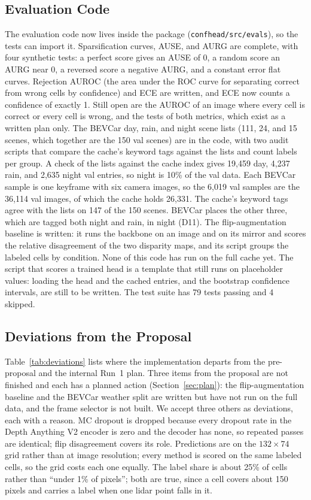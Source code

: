 \subsection{Evaluation Code}

The evaluation code now lives inside the package (\texttt{confhead/src/evals}), so the tests can import it. Sparsification curves, AUSE, and AURG are complete, with four synthetic tests: a perfect score gives an AUSE of 0, a random score an AURG near 0, a reversed score a negative AURG, and a constant error flat curves. Rejection AUROC (the area under the ROC curve for separating correct from wrong cells by confidence) and ECE are written, and ECE now counts a confidence of exactly 1. Still open are the AUROC of an image where every cell is correct or every cell is wrong, and the tests of both metrics, which exist as a written plan only. The BEVCar day, rain, and night scene lists (111, 24, and 15 scenes, which together are the 150 val scenes) are in the code, with two audit scripts that compare the cache's keyword tags against the lists and count labels per group. A check of the lists against the cache index gives 19,459 day, 4,237 rain, and 2,635 night val entries, so night is 10\% of the val data. Each BEVCar sample is one keyframe with six camera images, so the 6,019 val samples are the 36,114 val images, of which the cache holds 26,331. The cache's keyword tags agree with the lists on 147 of the 150 scenes. BEVCar places the other three, which are tagged both night and rain, in night (D11). The flip-augmentation baseline is written: it runs the backbone on an image and on its mirror and scores the relative disagreement of the two disparity maps, and its script groups the labeled cells by condition. None of this code has run on the full cache yet. The script that scores a trained head is a template that still runs on placeholder values: loading the head and the cached entries, and the bootstrap confidence intervals, are still to be written. The test suite has 79 tests passing and 4 skipped.

\subsection{Deviations from the Proposal}

Table~\ref{tab:deviations} lists where the implementation departs from the pre-proposal and the internal Run~1 plan. Three items from the proposal are not finished and each has a planned action (Section~\ref{sec:plan}): the flip-augmentation baseline and the BEVCar weather split are written but have not run on the full data, and the frame selector is not built. We accept three others as deviations, each with a reason. MC dropout is dropped because every dropout rate in the Depth Anything V2 encoder is zero and the decoder has none, so repeated passes are identical; flip disagreement covers its role. Predictions are on the $132 \times 74$ grid rather than at image resolution; every method is scored on the same labeled cells, so the grid costs each one equally. The label share is about 25\% of cells rather than ``under 1\% of pixels''; both are true, since a cell covers about 150 pixels and carries a label when one lidar point falls in it.


